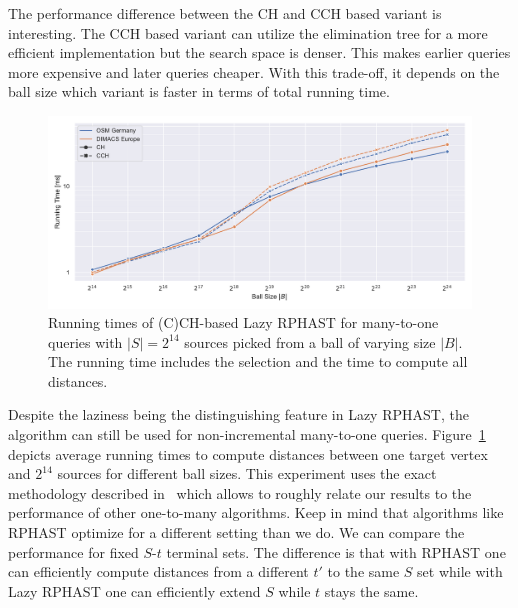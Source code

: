 \documentclass[manuscript,review]{acmart}
\begin{document}
The performance difference between the CH and CCH based variant is interesting.
The CCH based variant can utilize the elimination tree for a more efficient implementation but the search space is denser.
This makes earlier queries more expensive and later queries cheaper.
With this trade-off, it depends on the ball size which variant is faster in terms of total running time.

\begin{figure}
\centering
\includegraphics[width=\linewidth]{fig/lazy_rphast_many_to_one_both.pdf}
\caption{
Running times of (C)CH-based Lazy RPHAST for many-to-one queries with $|S| = 2^{14}$ sources picked from a ball of varying size $|B|$.
The running time includes the selection and the time to compute all distances.
}\label{fig:many_to_one}
\end{figure}

Despite the laziness being the distinguishing feature in Lazy RPHAST, the algorithm can still be used for non-incremental many-to-one queries.
Figure~\ref{fig:many_to_one} depicts average running times to compute distances between one target vertex and $2^{14}$ sources for different ball sizes.
This experiment uses the exact methodology described in~\cite{delling_et_al:OASIcs:2011:3266} which allows to roughly relate our results to the performance of other one-to-many algorithms.
Keep in mind that algorithms like RPHAST optimize for a different setting than we do.
We can compare the performance for fixed $S$-$t$ terminal sets.
The difference is that with RPHAST one can efficiently compute distances from a different $t'$ to the same $S$ set while with Lazy RPHAST one can efficiently extend $S$ while $t$ stays the same.
\end{document}
